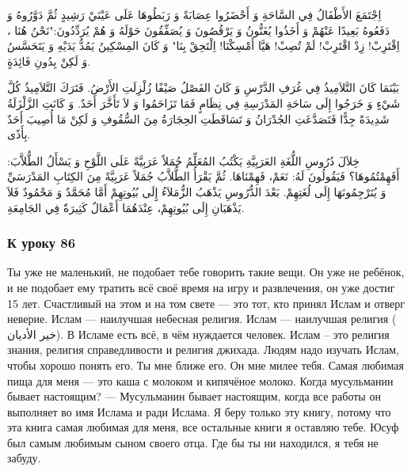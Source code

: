\documentclass[a5paper]{article}
\begin{document}
اِجْتَمَعَ الأَطْفَالُ فِي السَّاحَةِ وَ أَحْضَرُوا عِصَابَةً وَ رَبَطُوهَا عَلَى عَيْنَيْ رَشِيدٍ ثُمَّ دَوَّرُوهُ وَ دَفَعُوهُ بَعِيدًا عَنْهُمْ وَ أَخَذُوا يُغَنُّونُ وَ يَرْقُصُونَ وَ يُصَفِّقُونَ حَوْلَهُ وَ هُمْ يُرَدِّدُونَ:"نَحْنُ هُنَا ، اِقْتَرِبْ! زِدْ اقْتَرِبْ! لَمْ تُصِبْ! هَيَّا أَمْسِكْنَا! اِلْتَحِقْ بِنَا" وَ كَانَ المِسْكِينُ يَمُدُّ يَدَيْهِ وَ يَتَحَسَّسُ وَ لَكِنْ بِدُونِ فَائِدَةٍ.

بَيْنَمَا كَانَ التَّلاَمِيذُ فِي غُرَفِ الدَّرْسِ وَ كَانَ الفَصْلُ صَيْفًا زُلْزِلَتِ الأَرْضُ. فَتَرَكَ التَّلاَمِيذُ كُلَّ شَيْءٍ وَ خَرَجُوا إِلَى سَاحَةِ المَدْرَسِةِ فِي نِظَامٍ فَمَا تَزَاحَمُوا وَ لاَ تَأَخَّرَ أَحَدٌ. وَ كَانَتِ الزَّلْزَلَةُ شَدِيدَةً جِدًّا فَتَصَدَّعَتِ الجُدْرَانُ وَ تَسَاقَطَتِ الحِجَارَةُ مِنَ السُّقُوفِ وَ لَكِنْ مَا أُصِيبَ أَحَدٌ بِأَذًى.

خِلاَلَ دُرُوسِ اللُّغَةِ العَرَبِيَّةِ يَكْتُبُ المُعَلِّمُ جُمَلاً عَرَبِيَّةً عَلَى اللَّوْحِ وَ يَسْأَلُ الطُّلاَّبَ: أَفَهِمْتُمُوهَا؟ فَيَقُولُونَ لَهُ: نَعَمْ، فَهِمْنَاهَا. ثُمَّ يَقْرَأُ الطُّلاَّبُ جُمَلاً عَرَبِيَّةً مِنَ الكِتَابِ المَدْرَسَيِّ وَ يُتَرْجِمُونَهَا إِلَى لُغَتِهِمْ. بَعْدَ الدُّرُوسِ يَذْهَبُ الزُّمَلاَءُ إِِلَى بُيُوتِهِمْ أَمَّا مُحَمَّدٌ وَ مَحْمُودٌ فَلاَ يَذْهَبَانِ إِلَى بُيُوتِهِمْ، عِنْدَهُمَا أَعْمَالٌ كَثِيرَةٌ فِي الجَامِعَةِ.

\subsubsection{К уроку 86}
Ты уже не маленький, не подобает тебе говорить такие вещи. Он уже не ребёнок, и не подобает ему тратить всё своё время на игру и развлечения, он уже достиг 15 лет. Счастливый на этом и на том свете — это тот, кто принял Ислам и отверг неверие. Ислам — наилучшая небесная религия. Ислам — наилучшая религия ( خير الأديان). В Исламе есть всё, в чём нуждается человек. Ислам – это религия знания, религия справедливости и религия джихада. Людям надо изучать Ислам, чтобы хорошо понять его. Ты мне ближе его. Он мне милее тебя. Самая любимая пища для меня — это каша с молоком и кипячёное молоко. Когда мусульманин бывает настоящим? — Мусульманин бывает настоящим, когда все работы он выполняет во имя Ислама и ради Ислама. Я беру только эту книгу, потому что эта книга самая любимая для меня, все остальные книги я оставляю тебе. Юсуф был самым любимым сыном своего отца. Где бы ты ни находился, я тебя не забуду.
\end{document}
